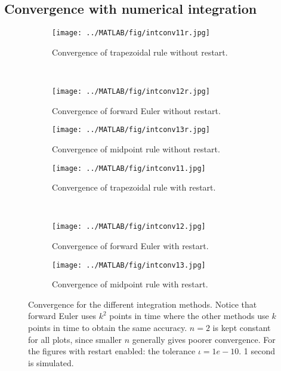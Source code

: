 \subsection{ Convergence with numerical integration }%
\begin{figure}[H]
        \centering
        \begin{subfigure}[b]{0.30\textwidth}
                \texttt{[image: ../MATLAB/fig/intconv11r.jpg]}
                \caption{ Convergence of trapezoidal rule without restart. }
                \label{fig:intconv11r}
        \end{subfigure}
        ~
        \begin{subfigure}[b]{0.30\textwidth}
                \texttt{[image: ../MATLAB/fig/intconv12r.jpg]}
                \caption{ Convergence of forward Euler without restart. }
                \label{fig:intconv12r}
        \end{subfigure}
        \begin{subfigure}[b]{0.30\textwidth}
                \texttt{[image: ../MATLAB/fig/intconv13r.jpg]}
                \caption{ Convergence of midpoint rule without restart. }
                \label{fig:intconv13r}
        \end{subfigure}         
        
        \begin{subfigure}[b]{0.30\textwidth}
                \texttt{[image: ../MATLAB/fig/intconv11.jpg]}
                \caption{ Convergence of trapezoidal rule with restart. }
                \label{fig:intconv11}
        \end{subfigure}
        ~
        \begin{subfigure}[b]{0.30\textwidth}
                \texttt{[image: ../MATLAB/fig/intconv12.jpg]}
                \caption{ Convergence of forward Euler with restart. }
                \label{fig:intconv12}
        \end{subfigure}
        \begin{subfigure}[b]{0.30\textwidth}
                \texttt{[image: ../MATLAB/fig/intconv13.jpg]}
                \caption{ Convergence of midpoint rule with restart. }
                \label{fig:intconv13}
        \end{subfigure}
        
 
\caption{ Convergence for the different integration methods. Notice that forward Euler uses $k^2$ points in time where the other methods use $k$ points in time to obtain the same accuracy. $n=2$ is kept constant for all plots, since smaller $n$ generally gives poorer convergence. For the figures with restart enabled: the tolerance $\iota = 1e-10$. 1 second is simulated. }
\label{fig:intconv}
\end{figure}
